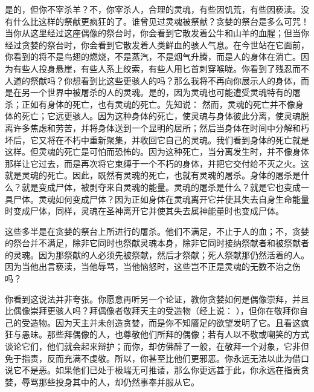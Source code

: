 是的，但你不宰杀羊？不，你宰杀人，合理的灵魂，有些因饥荒，有些因亵渎。没有什么比这样的祭献更疯狂的了。谁曾见过灵魂被祭献？贪婪的祭台是多么可咒！当你从这里经过这座偶像的祭台时，你会看到它散发着公牛和山羊的血腥；但当你经过贪婪的祭台时，你会看到它散发着人类鲜血的骇人气息。在今世站在它面前，你看到的将不是鸟翅的燃烧，不是蒸汽，不是烟气升腾，而是人的身体在消亡。因为有些人投身悬崖，有些人系上绞索，有些人用匕首刺穿喉咙。你看到了残忍而不人道的祭献吗？你想看到比这些更骇人的吗？那么我将不再向你展示人的身体，而是在另一个世界中被屠杀的人的灵魂。是的，因为灵魂也可能遭受灵魂特有的屠杀；正如有身体的死亡，也有灵魂的死亡。先知说： 然而，灵魂的死亡并不像身体的死亡；它远更骇人。因为这种身体的死亡，使灵魂与身体彼此分离，使灵魂脱离许多焦虑和劳苦，并将身体送到一个显明的居所；然后当身体在时间中分解和朽坏后，它又将在不朽中重新聚集，并收回它自己的灵魂。我们看到身体的死亡就是这样。但灵魂的死亡是可怕而恐怖的。因为这种死亡，当分离发生时，并不像身体那样让它过去，而是再次将它束缚于一个不朽的身体，并把它交付给不灭之火。这就是灵魂的死亡。因此，既然有灵魂的死亡，也就有灵魂的屠杀。身体的屠杀是什么？就是变成尸体，被剥夺来自灵魂的能量。灵魂的屠杀是什么？就是它也变成一具尸体。灵魂如何变成尸体？因为正如身体在灵魂离开它并使其失去自身生命能量时变成尸体，同样，灵魂在圣神离开它并使其失去属神能量时也变成尸体。\par

这些多半是在贪婪的祭台上所进行的屠杀。他们不满足，不止于人的血；不，贪婪的祭台并不满足，除非它同时也祭献灵魂本身，除非它同时接纳祭献者和被祭献者的灵魂。因为那祭献的人必须先被祭献，然后才祭献；死人祭献那仍然活着的人。因为当他出言亵渎，当他辱骂，当他恼怒时，这些岂不正是灵魂的无数不治之伤吗？\par

你看到这说法并非夸张。你愿意再听另一个论证，教你贪婪如何是偶像崇拜，并且比偶像崇拜更骇人吗？拜偶像者敬拜天主的受造物（经上说： ），但你在敬拜你自己的受造物。因为天主并未创造贪婪，而是你不知餍足的欲望发明了它。且看这疯狂与愚昧。那些拜偶像的人，也尊敬他们所拜的偶像；若有人以不敬或嘲笑的方式谈论它们，他们就会起来辩护；而你，却仿佛醉了一般，在敬拜一个对象，它非但免于指责，反而充满不虔敬。所以，你甚至比他们更邪恶。你永远无法以此为借口说它不是恶。如果他们已处于极端无可推诿，那么你更远甚于此，你永远在指责贪婪，辱骂那些投身其中的人，却仍然事奉并服从它。\par

